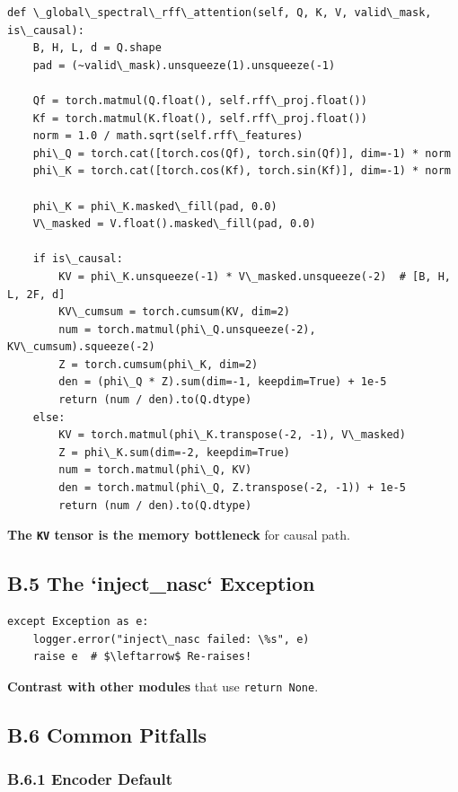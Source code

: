 \begin{lstlisting}
def \_global\_spectral\_rff\_attention(self, Q, K, V, valid\_mask, is\_causal):
    B, H, L, d = Q.shape
    pad = (~valid\_mask).unsqueeze(1).unsqueeze(-1)
    
    Qf = torch.matmul(Q.float(), self.rff\_proj.float())
    Kf = torch.matmul(K.float(), self.rff\_proj.float())
    norm = 1.0 / math.sqrt(self.rff\_features)
    phi\_Q = torch.cat([torch.cos(Qf), torch.sin(Qf)], dim=-1) * norm
    phi\_K = torch.cat([torch.cos(Kf), torch.sin(Kf)], dim=-1) * norm
    
    phi\_K = phi\_K.masked\_fill(pad, 0.0)
    V\_masked = V.float().masked\_fill(pad, 0.0)
    
    if is\_causal:
        KV = phi\_K.unsqueeze(-1) * V\_masked.unsqueeze(-2)  # [B, H, L, 2F, d]
        KV\_cumsum = torch.cumsum(KV, dim=2)
        num = torch.matmul(phi\_Q.unsqueeze(-2), KV\_cumsum).squeeze(-2)
        Z = torch.cumsum(phi\_K, dim=2)
        den = (phi\_Q * Z).sum(dim=-1, keepdim=True) + 1e-5
        return (num / den).to(Q.dtype)
    else:
        KV = torch.matmul(phi\_K.transpose(-2, -1), V\_masked)
        Z = phi\_K.sum(dim=-2, keepdim=True)
        num = torch.matmul(phi\_Q, KV)
        den = torch.matmul(phi\_Q, Z.transpose(-2, -1)) + 1e-5
        return (num / den).to(Q.dtype)
\end{lstlisting}

\textbf{The \texttt{KV} tensor is the memory bottleneck} for causal path.

\subsection{B.5 The `inject\_nasc` Exception}

\begin{lstlisting}
except Exception as e:
    logger.error("inject\_nasc failed: \%s", e)
    raise e  # $\leftarrow$ Re-raises!
\end{lstlisting}

\textbf{Contrast with other modules} that use \texttt{return None}.

\subsection{B.6 Common Pitfalls}

\subsubsection{B.6.1 Encoder Default}

